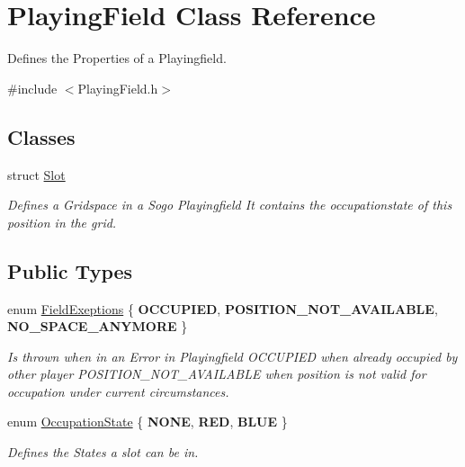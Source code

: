 \hypertarget{classPlayingField}{\section{Playing\-Field Class Reference}
\label{classPlayingField}
}


Defines the Properties of a Playingfield.  




{\ttfamily \#include $<$Playing\-Field.\-h$>$}

\subsection*{Classes}
\begin{DoxyCompactItemize}
\item 
struct \hyperlink{structPlayingField_1_1Slot}{Slot}
\begin{DoxyCompactList}\small\item\em Defines a Gridspace in a Sogo Playingfield It contains the occupationstate of this position in the grid. \end{DoxyCompactList}\end{DoxyCompactItemize}
\subsection*{Public Types}
\begin{DoxyCompactItemize}
\item 
enum \hyperlink{classPlayingField_a6032d4d7297d628a368cde7db331d7f6}{Field\-Exeptions} \{ {\bfseries O\-C\-C\-U\-P\-I\-E\-D}, 
{\bfseries P\-O\-S\-I\-T\-I\-O\-N\-\_\-\-N\-O\-T\-\_\-\-A\-V\-A\-I\-L\-A\-B\-L\-E}, 
{\bfseries N\-O\-\_\-\-S\-P\-A\-C\-E\-\_\-\-A\-N\-Y\-M\-O\-R\-E}
 \}
\begin{DoxyCompactList}\small\item\em Is thrown when in an Error in Playingfield O\-C\-C\-U\-P\-I\-E\-D when already occupied by other player P\-O\-S\-I\-T\-I\-O\-N\-\_\-\-N\-O\-T\-\_\-\-A\-V\-A\-I\-L\-A\-B\-L\-E when position is not valid for occupation under current circumstances. \end{DoxyCompactList}\item 
enum \hyperlink{classPlayingField_ac6df152a3f820aa04a00ab4df4a9d265}{Occupation\-State} \{ {\bfseries N\-O\-N\-E}, 
{\bfseries R\-E\-D}, 
{\bfseries B\-L\-U\-E}
 \}
\begin{DoxyCompactList}\small\item\em Defines the States a slot can be in. \end{DoxyCompactList}\end{DoxyCompactItemize}
